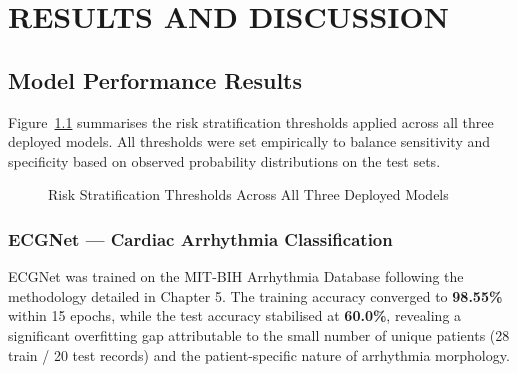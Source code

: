 \chapter{\MakeUppercase{Results and Discussion}}
\justifying

\section{Model Performance Results}

Figure~\ref{fig:riskthresholds} summarises the risk stratification thresholds applied across all three deployed models. All thresholds were set empirically to balance sensitivity and specificity based on observed probability distributions on the test sets.

\begin{figure}[h!]
\centering
{}
\caption[Risk Stratification Thresholds]{Risk Stratification Thresholds Across All Three Deployed Models}
\label{fig:riskthresholds}
\end{figure}

\subsection{ECGNet — Cardiac Arrhythmia Classification}

ECGNet was trained on the MIT-BIH Arrhythmia Database following the methodology detailed in Chapter 5. The training accuracy converged to \textbf{98.55\%} within 15 epochs, while the test accuracy stabilised at \textbf{60.0\%}, revealing a significant overfitting gap attributable to the small number of unique patients (28 train / 20 test records) and the patient-specific nature of arrhythmia morphology.

